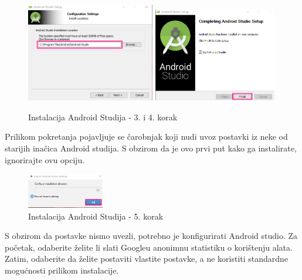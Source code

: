 \documentclass[11pt,a4paper,twoside]{article}
\begin{document}
	\begin{figure}[!h]
		\centering
		\includegraphics[width=0.5\textwidth]{install_03.png}
			\hfill
		\includegraphics[width=0.48\textwidth]{install_04.png}
		\caption{Instalacija Android Studija - 3. i 4. korak}
		\label{fig:install_03}	
	\end{figure}


	Prilikom pokretanja pojavljuje se čarobnjak koji nudi uvoz postavki iz neke od starijih inačica Android studija. S obzirom da je ovo prvi put kako ga instalirate, ignorirajte ovu opciju. 
	
	\begin{figure}[!h]
		\centering
		\includegraphics[width=0.3\textwidth]{install_05.png}
		\caption{Instalacija Android Studija - 5. korak}
		\label{fig:install_05}	
	\end{figure}

	S obzirom da postavke nismo uvezli, potrebno je konfigurirati Android studio. Za početak, odaberite želite li slati Googleu anonimnu statistiku o korištenju alata. 	Zatim, odaberite da želite postaviti vlastite postavke, a ne koristiti standardne mogućnosti prilikom instalacije. 	
\end{document}
